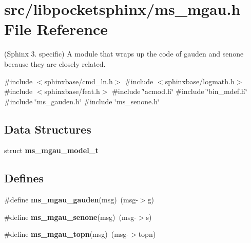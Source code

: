 \section{src/libpocketsphinx/ms\-\_\-mgau.h \-File \-Reference}
\label{ms__mgau_8h}


(\-Sphinx 3. specific) \-A module that wraps up the code of gauden and senone because they are closely related.  


{\ttfamily \#include $<$sphinxbase/cmd\-\_\-ln.\-h$>$}\*
{\ttfamily \#include $<$sphinxbase/logmath.\-h$>$}\*
{\ttfamily \#include $<$sphinxbase/feat.\-h$>$}\*
{\ttfamily \#include \char`\"{}acmod.\-h\char`\"{}}\*
{\ttfamily \#include \char`\"{}bin\-\_\-mdef.\-h\char`\"{}}\*
{\ttfamily \#include \char`\"{}ms\-\_\-gauden.\-h\char`\"{}}\*
{\ttfamily \#include \char`\"{}ms\-\_\-senone.\-h\char`\"{}}\*
\subsection*{\-Data \-Structures}
\begin{DoxyCompactItemize}
\item 
struct {\bf ms\-\_\-mgau\-\_\-model\-\_\-t}
\end{DoxyCompactItemize}
\subsection*{\-Defines}
\begin{DoxyCompactItemize}
\item 
\#define {\bfseries ms\-\_\-mgau\-\_\-gauden}(msg)~(msg-\/$>$g)\label{ms__mgau_8h_a95f75d32387d89eb6fa2bc65e032d34c}

\item 
\#define {\bfseries ms\-\_\-mgau\-\_\-senone}(msg)~(msg-\/$>$s)\label{ms__mgau_8h_a182da1c0e7872e853566f7728001d00c}

\item 
\#define {\bfseries ms\-\_\-mgau\-\_\-topn}(msg)~(msg-\/$>$topn)\label{ms__mgau_8h_acad38d81d6485f2aad5176f8f4283579}

\end{DoxyCompactItemize}
